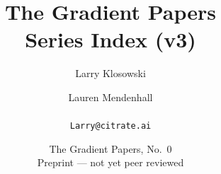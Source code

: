 
\title{\textbf{The Gradient Papers}\\[3pt]\large Series Index (v3)}
\author{Larry Klosowski \and Lauren Mendenhall\\[2pt]\CitrateAffil\\ \texttt{Larry@citrate.ai}}
\date{The Gradient Papers, No.~0 \\ Preprint --- not yet peer reviewed}
\maketitle
